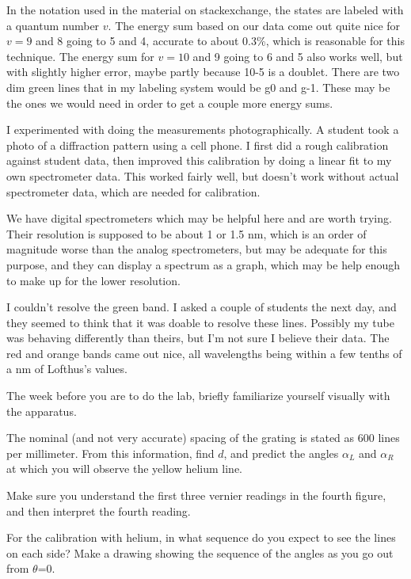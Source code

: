 In the notation used in the material on stackexchange, the states are
labeled with a quantum number $v$.  The energy sum based on our data
come out quite nice for $v=9$ and 8 going to 5 and 4, accurate to
about 0.3\%, which is reasonable for this technique.  The energy sum
for $v=10$ and 9 going to 6 and 5 also works well, but with slightly
higher error, maybe partly because 10-5 is a doublet.  There are two
dim green lines that in my labeling system would be g0 and g-1.
These may be the
ones we would need in order to get a couple more energy sums.

I experimented with doing the measurements photographically.  A
student took a photo of a diffraction pattern using a cell phone.  I
first did a rough calibration against student data, then improved this
calibration by doing a linear fit to my own spectrometer data.
This worked fairly well, but doesn't work without actual spectrometer
data, which are needed for calibration.

We have digital spectrometers which may be helpful here and are worth
trying. Their resolution is supposed to be about 1 or 1.5 nm, which is
an order of magnitude worse than the analog spectrometers, but may be
adequate for this purpose, and they can display a spectrum as a graph,
which may be help enough to make up for the lower resolution.

I couldn't resolve the green band. I asked a couple of students the
next day, and they seemed to think that it was doable to resolve these
lines. Possibly my tube was behaving differently than theirs, but I'm
not sure I believe their data.  The red and orange bands came out
nice, all wavelengths being within a few tenths of a nm of Lofthus's
values.

\prelab

The week before you are to do the lab, briefly familiarize
yourself visually with the apparatus.

\prelabquestion  
The nominal (and not very accurate) spacing of the grating is stated
as 600 lines per millimeter. From this information, find $d$, and
predict the angles $\alpha_L$ and $\alpha_R$ at which you will observe the yellow helium line.


\prelabquestion  Make sure you understand the first three vernier
readings in the fourth figure, and then interpret the fourth reading.

\prelabquestion  For the calibration with helium,
in what sequence do you expect to see the lines on
each side? Make a drawing showing the sequence of the angles
as you go out from $\theta $=0.
